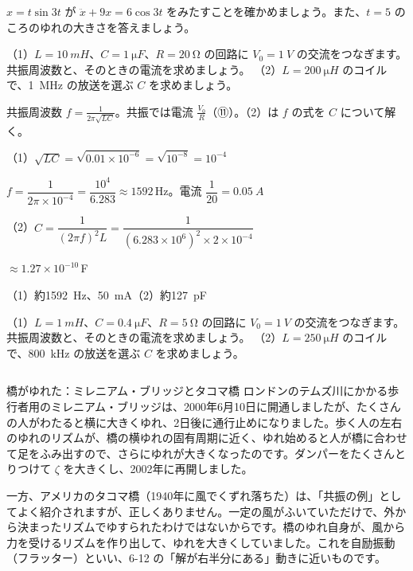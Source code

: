 \begin{jibun}
$x=t\sin3t$ が $\ddot x+9x=6\cos3t$ をみたすことを確かめましょう。また、$t=5$ のころのゆれの大きさを答えましょう。
\end{jibun}

\begin{reidai}
（1）$L=\qty{10}{mH}$、$C=\qty{1}{\micro F}$、$R=\qty{20}{\ohm}$ の回路に $V_0=\qty{1}{V}$ の交流をつなぎます。共振周波数と、そのときの電流を求めましょう。\newline
（2）$L=\qty{200}{\micro H}$ のコイルで、\qty{1}{MHz} の放送を選ぶ $C$ を求めましょう。\par
\kangaekata 共振周波数 $f=\frac{1}{2\pi\sqrt{LC}}$。共振では電流 $\frac{V_0}{R}$（⑪）。（2）は $f$ の式を $C$ について解く。\par
\shiki （1）\nobreak $\sqrt{LC}=\sqrt{0.01\times10^{-6}}=\sqrt{10^{-8}}=10^{-4}$\par
\bkvinq $f=\dfrac{1}{2\pi\times10^{-4}}=\dfrac{10^4}{6.283}\approx1592$\,Hz。電流 $\dfrac{1}{20}=\qty{0.05}{A}$\par
\bkvinq （2）\nobreak $C=\dfrac{1}{(2\pi f)^2L}=\dfrac{1}{(6.283\times10^6)^2\times2\times10^{-4}}$\par
\bkvinq \phantom{（2）$C$}${}\approx1.27\times10^{-10}$\,F\par
\kotae （1）\nobreak 約\qty{1592}{Hz}、\qty{50}{mA}\quad（2）\nobreak 約\qty{127}{pF}
\end{reidai}

\begin{jibun}
（1）$L=\qty{1}{mH}$、$C=\qty{0.4}{\micro F}$、$R=\qty{5}{\ohm}$ の回路に $V_0=\qty{1}{V}$ の交流をつなぎます。共振周波数と、そのときの電流を求めましょう。\newline
（2）$L=\qty{250}{\micro H}$ のコイルで、\qty{800}{kHz} の放送を選ぶ $C$ を求めましょう。
\end{jibun}

\begin{column}{橋がゆれた：ミレニアム・ブリッジとタコマ橋}
ロンドンのテムズ川にかかる歩行者用のミレニアム・ブリッジは、2000年6月10日に開通しましたが、たくさんの人がわたると横に大きくゆれ、2日後に通行止めになりました。歩く人の左右のゆれのリズムが、橋の横ゆれの固有周期に近く、ゆれ始めると人が橋に合わせて足をふみ出すので、さらにゆれが大きくなったのです。ダンパーをたくさんとりつけて $\zeta$ を大きくし、2002年に再開しました。

一方、アメリカのタコマ橋（1940年に風でくずれ落ちた）は、「共振の例」としてよく紹介されますが、正しくありません。一定の風がふいていただけで、外から決まったリズムでゆすられたわけではないからです。橋のゆれ自身が、風から力を受けるリズムを作り出して、ゆれを大きくしていました。これを自励振動（フラッター）といい、6-12 の「解が右半分にある」動きに近いものです。
\end{column}

